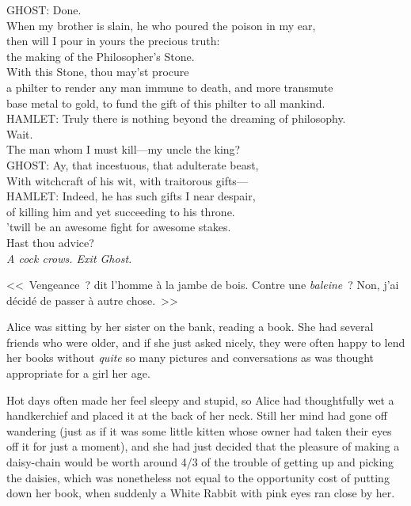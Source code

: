 \begin{playdialog}
GHOST: Done.\\
When my brother is slain, he who poured the poison in my ear,\\
then will I pour in yours the precious truth:\\
the making of the Philosopher’s Stone.\\
With this Stone, thou may’st procure\\
a philter to render any man immune to death, and more transmute\\ base metal to gold, to fund the gift of this philter to all mankind.\\

HAMLET: Truly there is nothing beyond the dreaming of philosophy.\\ Wait.\\ The man whom I must kill—my uncle the king?\\

GHOST: Ay, that incestuous, that adulterate beast,\\
With witchcraft of his wit, with traitorous gifts—\\

HAMLET: Indeed, he has such gifts I near despair,\\
of killing him and yet succeeding to his throne.\\
’twill be an awesome fight for awesome stakes.\\
Hast thou advice?\\

\emph{A cock crows. Exit Ghost.}
\end{playdialog}


<<~Vengeance~? dit l'homme à la jambe de bois. Contre une \emph{baleine}~? Non, j'ai décidé de passer à autre chose.~>>


Alice was sitting by her sister on the bank, reading a book. She had several friends who were older, and if she just asked nicely, they were often happy to lend her books without \emph{quite} so many pictures and conversations as was thought appropriate for a girl her age.

Hot days often made her feel sleepy and stupid, so Alice had thoughtfully wet a handkerchief and placed it at the back of her neck. Still her mind had gone off wandering (just as if it was some little kitten whose owner had taken their eyes off it for just a moment), and she had just decided that the pleasure of making a daisy-chain would be worth around 4/3 of the trouble of getting up and picking the daisies, which was nonetheless not equal to the opportunity cost of putting down her book, when suddenly a White Rabbit with pink eyes ran close by her.

